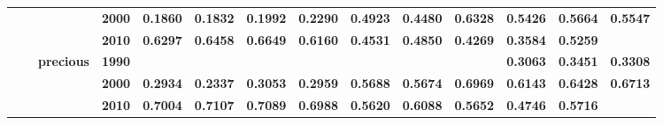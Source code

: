 \documentclass[
  authoryear,
  preprint,
  3p]{elsarticle}
\begin{document}
\begin{landscape}
\begin{longtable}[t]{>{}l>{}l>{}l>{}l>{}r>{}r>{}r>{}r>{}r>{}r>{}r>{}r>{}r>{}r}
\textbf{} & \textbf{} & \textbf{} & \textbf{2000} & \textcolor[HTML]{4285f4}{\textbf{0.1860}} & \textcolor[HTML]{4285f4}{\textbf{0.1832}} & \textcolor[HTML]{4285f4}{\textbf{0.1992}} & \textcolor[HTML]{4285f4}{\textbf{0.2290}} & \textcolor[HTML]{4285f4}{\textbf{0.4923}} & \textcolor[HTML]{4285f4}{\textbf{0.4480}} & \textcolor[HTML]{4285f4}{\textbf{0.6328}} & \textcolor[HTML]{4285f4}{\textbf{0.5426}} & \textcolor[HTML]{4285f4}{\textbf{0.5664}} & \textcolor[HTML]{4285f4}{\textbf{0.5547}}\\
\textbf{} & \textbf{} & \textbf{} & \textbf{2010} & \textcolor[HTML]{4285f4}{\textbf{0.6297}} & \textcolor[HTML]{4285f4}{\textbf{0.6458}} & \textcolor[HTML]{4285f4}{\textbf{0.6649}} & \textcolor[HTML]{4285f4}{\textbf{0.6160}} & \textcolor[HTML]{4285f4}{\textbf{0.4531}} & \textcolor[HTML]{4285f4}{\textbf{0.4850}} & \textcolor[HTML]{4285f4}{\textbf{0.4269}} & \textcolor[HTML]{4285f4}{\textbf{0.3584}} & \textcolor[HTML]{4285f4}{\textbf{0.5259}} & \textcolor[HTML]{4285f4}{\textbf{}}\\
\textbf{} & \textbf{} & \textbf{precious} & \textbf{1990} & \textcolor[HTML]{4285f4}{\textbf{}} & \textcolor[HTML]{4285f4}{\textbf{}} & \textcolor[HTML]{4285f4}{\textbf{}} & \textcolor[HTML]{4285f4}{\textbf{}} & \textcolor[HTML]{4285f4}{\textbf{}} & \textcolor[HTML]{4285f4}{\textbf{}} & \textcolor[HTML]{4285f4}{\textbf{}} & \textcolor[HTML]{4285f4}{\textbf{0.3063}} & \textcolor[HTML]{4285f4}{\textbf{0.3451}} & \textcolor[HTML]{4285f4}{\textbf{0.3308}}\\
\textbf{} & \textbf{} & \textbf{} & \textbf{2000} & \textcolor[HTML]{4285f4}{\textbf{0.2934}} & \textcolor[HTML]{4285f4}{\textbf{0.2337}} & \textcolor[HTML]{4285f4}{\textbf{0.3053}} & \textcolor[HTML]{4285f4}{\textbf{0.2959}} & \textcolor[HTML]{4285f4}{\textbf{0.5688}} & \textcolor[HTML]{4285f4}{\textbf{0.5674}} & \textcolor[HTML]{4285f4}{\textbf{0.6969}} & \textcolor[HTML]{4285f4}{\textbf{0.6143}} & \textcolor[HTML]{4285f4}{\textbf{0.6428}} & \textcolor[HTML]{4285f4}{\textbf{0.6713}}\\
\textbf{} & \textbf{} & \textbf{} & \textbf{2010} & \textcolor[HTML]{4285f4}{\textbf{0.7004}} & \textcolor[HTML]{4285f4}{\textbf{0.7107}} & \textcolor[HTML]{4285f4}{\textbf{0.7089}} & \textcolor[HTML]{4285f4}{\textbf{0.6988}} & \textcolor[HTML]{4285f4}{\textbf{0.5620}} & \textcolor[HTML]{4285f4}{\textbf{0.6088}} & \textcolor[HTML]{4285f4}{\textbf{0.5652}} & \textcolor[HTML]{4285f4}{\textbf{0.4746}} & \textcolor[HTML]{4285f4}{\textbf{0.5716}} & \textcolor[HTML]{4285f4}{\textbf{}}\\

\end{longtable}
\end{landscape}
\end{document}
